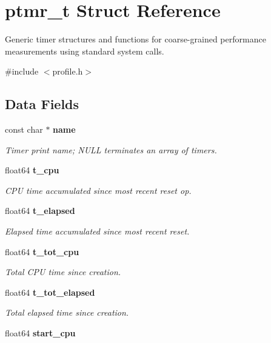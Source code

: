 \section{ptmr\-\_\-t Struct Reference}
\label{structptmr__t}


Generic timer structures and functions for coarse-\/grained performance measurements using standard system calls.  




{\ttfamily \#include $<$profile.\-h$>$}

\subsection*{Data Fields}
\begin{DoxyCompactItemize}
\item 
const char $\ast$ {\bf name}
\begin{DoxyCompactList}\small\item\em Timer print name; N\-U\-L\-L terminates an array of timers. \end{DoxyCompactList}\item 
float64 {\bf t\-\_\-cpu}\label{structptmr__t_acbd784f7332329999925d396deae3a5d}

\begin{DoxyCompactList}\small\item\em C\-P\-U time accumulated since most recent reset op. \end{DoxyCompactList}\item 
float64 {\bf t\-\_\-elapsed}\label{structptmr__t_a743fce329d82fd7a9130cba5bbccd991}

\begin{DoxyCompactList}\small\item\em Elapsed time accumulated since most recent reset. \end{DoxyCompactList}\item 
float64 {\bf t\-\_\-tot\-\_\-cpu}\label{structptmr__t_a301d13acc21718143b8b39b7af8b6677}

\begin{DoxyCompactList}\small\item\em Total C\-P\-U time since creation. \end{DoxyCompactList}\item 
float64 {\bf t\-\_\-tot\-\_\-elapsed}\label{structptmr__t_a2dc87aa035c8eb542279ca4496dd76f1}

\begin{DoxyCompactList}\small\item\em Total elapsed time since creation. \end{DoxyCompactList}\item 
float64 {\bf start\-\_\-cpu}\label{structptmr__t_a85c0c5f0e321cf11fb478b92a05223e8}


\end{DoxyCompactItemize}
